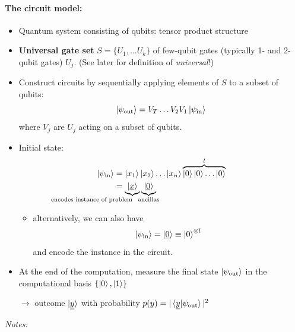 \documentclass[a4paper, 12pt]{article}
\theoremstyle{plain}
\theoremstyle{definition}
\theoremstyle{remark}
\begin{document}
\paragraph{The circuit model:}
\begin{itemize}
  \item Quantum system consisting of qubits: tensor product structure
  \item \textbf{Universal gate set} $S=\{U_1, \ldots U_k\}$ of few-qubit gates (typically 1- and 2-qubit gates) $U_j$. (See later for definition of \emph{universal}!)
  \item Construct circuits by sequentially applying elements of $S$ to a subset of qubits:
    \begin{equation*}
      \ket{\psi_{\textnormal{out}}} = V_T \ldots V_2 V_1 \ket{\psi_{\textnormal{in}}}
    \end{equation*}
    where $V_j$ are $U_j$ acting on a subset of qubits.

  \item Initial state:
    \begin{align*}
      \ket{\psi_{\textnormal{in}}} &= \ket{x_1}\ket{x_2}\ldots\ket{x_n}\overbrace{\ket{0}\ket{0}\ldots \ket{0}}^l \\
      &= \underbrace{\ket{\underline{x}}}_{\mathllap{\text{encodes instance of problem}}}\underbrace{\ket{\underline{0}}}_{\mathclap{\text{ancillas}}}
    \end{align*}
    \begin{itemize}
      \item alternatively, we can also have
        \begin{equation*}
          \ket{\psi_{\textnormal{in}}} = \ket{\underline{0}}\equiv\ket{0}^{\otimes l}
        \end{equation*}
        and encode the instance in the circuit.
    \end{itemize}
  \item At the end of the computation, measure the final state $\ket{\psi_{\textnormal{out}}}$ in the computational basis $\{\ket{0},\ket{1}\}$

    $\longrightarrow$ outcome $\ket{\underline{y}}$ with probability $p(y)=|\braket{\underline{y}|\psi_{\textnormal{out}}}|^2$
\end{itemize}

\emph{Notes:}
\end{document}
